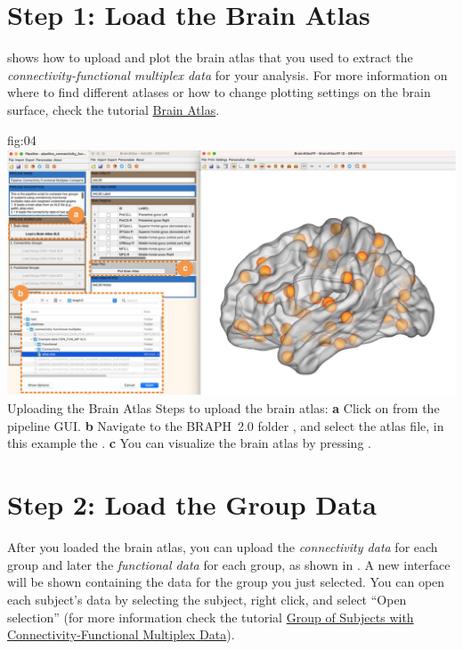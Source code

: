 \documentclass[justified]{tufte-handout}
\begin{document}
\clearpage
\section{Step 1: Load the Brain Atlas}

 shows how to upload and plot the brain atlas that you used to extract the \emph{connectivity-functional multiplex data} for your analysis. For more information on where to find different atlases or how to change plotting settings on the brain surface, check the tutorial \href{https://github.com/braph-software/BRAPH-2/tree/develop/tutorials/general/tut_ba}{Brain Atlas}.

	{fig:04}
	{
	\includegraphics{fig04.jpg}
	}
	{Uploading the Brain Atlas}
	{
	Steps to upload the brain atlas:
	{\bf a} Click on  from the pipeline GUI.
	{\bf b} Navigate to the BRAPH~2.0 folder , and select the atlas file, in this example the .  
	{\bf c} You can visualize the brain atlas by pressing . 
	}
 
\clearpage
\section{Step 2: Load the Group Data}

After you loaded the brain atlas, you can upload the \emph{connectivity data} for each group and later the \emph{functional data} for each group, as shown in . A new interface will be shown containing the data for the group you just selected. You can open each subject’s data by selecting the subject, right click, and select “Open selection” (for more information check the tutorial \href{https://github.com/braph-software/BRAPH-2/tree/develop/tutorials/general/tut_gr_con_fun_mp}{Group of Subjects with Connectivity-Functional Multiplex Data}).
\end{document}
